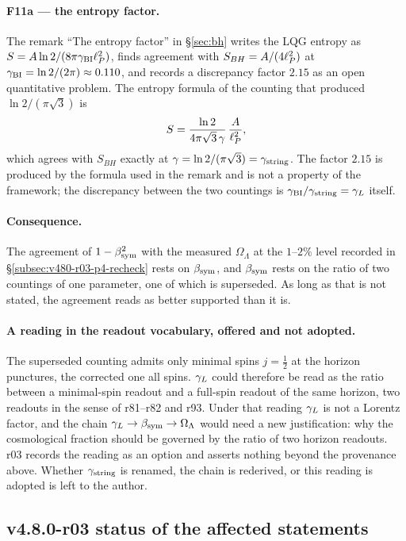 \paragraph{F11a --- the entropy factor.}
The remark ``The entropy factor'' in \S\ref{sec:bh} writes the LQG entropy as
\(S=A\ln2/(8\pi\gamma_{\mathrm{BI}}\ell_P^2)\), finds agreement with \(S_{BH}=A/(4\ell_P^2)\) at
\(\gamma_{\mathrm{BI}}=\ln2/(2\pi)\approx0.110\), and records a discrepancy factor \(2.15\) as an open quantitative
problem.  The entropy formula of the counting that produced \(\ln2/(\pi\sqrt3)\) is
\[
S=\frac{\ln2}{4\pi\sqrt3\,\gamma}\,\frac{A}{\ell_P^2},
\]
which agrees with \(S_{BH}\) exactly at \(\gamma=\ln2/(\pi\sqrt3)=\gamma_{\mathrm{string}}\).  The factor \(2.15\)
is produced by the formula used in the remark and is not a property of the framework; the
discrepancy between the two countings is \(\gamma_{\mathrm{BI}}/\gamma_{\mathrm{string}}=\gamma_L\) itself.

\paragraph{Consequence.}
The agreement of \(1-\beta_{\mathrm{sym}}^2\) with the measured \(\Omega_\Lambda\) at the \(1\)--\(2\%\) level
recorded in \S\ref{subsec:v480-r03-p4-recheck} rests on \(\beta_{\mathrm{sym}}\), and \(\beta_{\mathrm{sym}}\) rests on the ratio
of two countings of one parameter, one of which is superseded.  As long as that is not stated,
the agreement reads as better supported than it is.

\paragraph{A reading in the readout vocabulary, offered and not adopted.}
The superseded counting admits only minimal spins \(j=\tfrac12\) at the horizon punctures, the
corrected one all spins.  \(\gamma_L\) could therefore be read as the ratio between a minimal-spin
readout and a full-spin readout of the same horizon, two readouts in the sense of r81--r82 and
r93.  Under that reading \(\gamma_L\) is not a Lorentz factor, and the chain
\(\gamma_L\to\beta_{\mathrm{sym}}\to\Omega_\Lambda\) would need a new justification: why the cosmological fraction
should be governed by the ratio of two horizon readouts.  r03 records the reading as an option
and asserts nothing beyond the provenance above.  Whether \(\gamma_{\mathrm{string}}\) is renamed, the chain is
rederived, or this reading is adopted is left to the author.

\subsection*{v4.8.0-r03 status of the affected statements}
\label{subsec:v480-r03-status}

